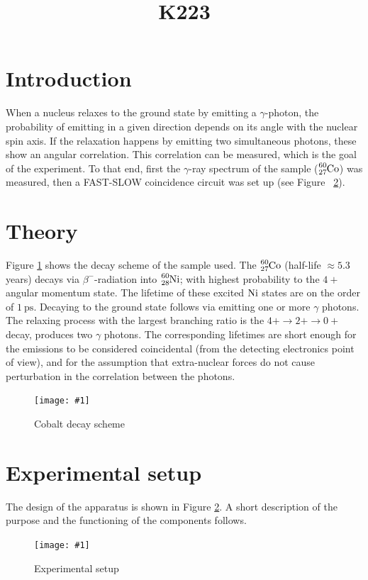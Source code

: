 \documentclass[twocolumn]{article}
\title{K223}
\newcommand{\insertFigure}[1]{%
   \texttt{[image: \#1]}%
}
\begin{document}
\maketitle
\newpage
\section{Introduction}
When a nucleus relaxes to the ground state by emitting a $\gamma$-photon, the probability of emitting in a given direction depends on its angle with the nuclear spin axis. If the relaxation happens by emitting two simultaneous photons, these show an angular correlation. This correlation can be measured, which is the goal of the experiment. To that end, first the $\gamma$-ray spectrum of the sample ($\ce{_27^{60}Co}$) was measured, then a FAST-SLOW coincidence circuit was set up (see Figure ~\ref{fig:exp_setup}). 
\section{Theory}
Figure \ref{fig:cobalt_scheme} shows the decay scheme of the sample used. The $\ce{_27^{60}Co}$ (half-life $\approx 5.3$ years) decays via $\beta^-$-radiation into $\ce{_28^{60}Ni}$; with highest probability to the $4+$ angular momentum state. %
The lifetime of these excited $\ce{Ni}$ states are on the order of $\SI{1}{\pico\second}$. 
Decaying to the ground state follows via emitting one or more $\gamma$ photons. The relaxing process with the largest branching ratio is the $4+ \rightarrow 2+ \rightarrow 0+$ decay, produces two $\gamma$ photons. The corresponding lifetimes are short enough for the emissions to be considered coincidental (from the detecting electronics point of view), and for the assumption that extra-nuclear forces do not cause perturbation in the correlation between the photons.
\begin{figure}[!h]
\centering
\insertFigure{cobalt_scheme.png}
\caption{Cobalt decay scheme \cite{cobalt_scheme}}
\label{fig:cobalt_scheme}
\end{figure}
\section{Experimental setup}
The design of the apparatus is shown in Figure \ref{fig:exp_setup}. A short description of the purpose and the functioning of the components follows.
\begin{figure}[!h]
\centering
\insertFigure{k223_setup.png}
\caption{Experimental setup \cite{booklet}}
\label{fig:exp_setup}
\end{figure}
\end{document}
